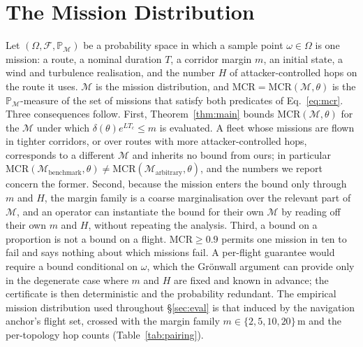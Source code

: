 \documentclass[conference,letterpaper,10pt]{IEEEtran}   %
\newcommand{\MCR}{\mathrm{MCR}}
\begin{document}
\section{The Mission Distribution}
\label{app:probspace}
\label{sec:missiondist}
Let $(\Omega,\mathcal{F},\mathbb{P}_{\mathcal{M}})$ be a probability space in
which a sample point $\omega\in\Omega$ is one mission: a route, a nominal
duration $T$, a corridor margin $m$, an initial state, a wind and turbulence
realisation, and the number $H$ of attacker-controlled hops on the route it
uses. $\mathcal{M}$ is the mission distribution, and
$\MCR=\MCR(\mathcal{M},\theta)$ is the $\mathbb{P}_{\mathcal{M}}$-measure of the
set of missions that satisfy both predicates of Eq.~\eqref{eq:mcr}. Three
consequences follow. First, Theorem~\ref{thm:main} bounds
$\MCR(\mathcal{M},\theta)$ for the $\mathcal{M}$ under which
$\delta(\theta)e^{LT_c}\le m$ is evaluated. A fleet whose missions are flown in
tighter corridors, or over routes with more attacker-controlled hops,
corresponds to a different $\mathcal{M}$ and inherits no bound from ours; in
particular
$\MCR(\mathcal{M}_{\text{benchmark}},\theta)\neq\MCR(\mathcal{M}_{\text{arbitrary}},\theta)$,
and the numbers we report concern the former. Second, because the mission
enters the bound only through $m$ and $H$, the margin family is a coarse
marginalisation over the relevant part of $\mathcal{M}$, and an operator can
instantiate the bound for their own $\mathcal{M}$ by reading off their own $m$
and $H$, without repeating the analysis. Third, a bound on a proportion is not a
bound on a flight. $\MCR\ge0.9$ permits one mission in ten to fail and says
nothing about which missions fail. A per-flight guarantee would require a bound
conditional on $\omega$, which the Gr\"onwall argument can provide only in the
degenerate case where $m$ and $H$ are fixed and known in advance; the
certificate is then deterministic and the probability redundant. The empirical
mission distribution used throughout \S\ref{sec:eval} is that induced by the
navigation anchor's flight set, crossed with the margin family
$m\in\{2,5,10,20\}$\,m and the per-topology hop counts
(Table~\ref{tab:pairing}).
\end{document}
